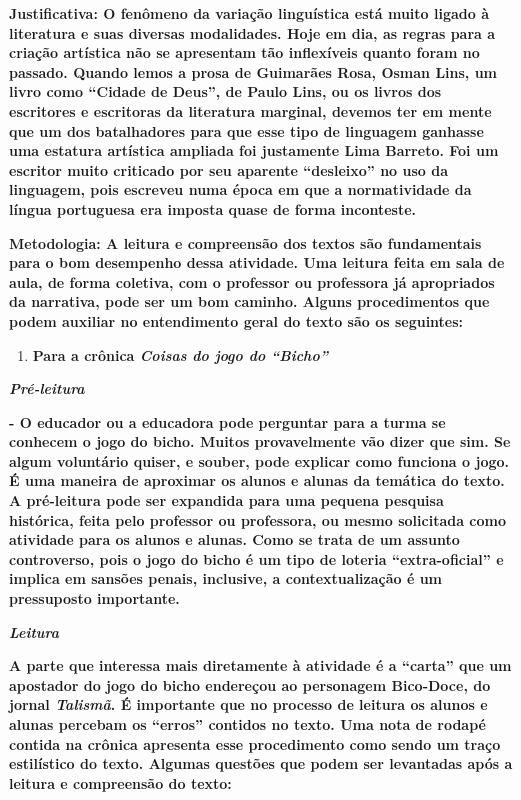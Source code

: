 \textbf{Justificativa: O fenômeno da variação linguística está muito
ligado à literatura e suas diversas modalidades. Hoje em dia, as regras
para a criação artística não se apresentam tão inflexíveis quanto foram
no passado. Quando lemos a prosa de Guimarães Rosa, Osman Lins, um livro
como ``Cidade de Deus'', de Paulo Lins, ou os livros dos escritores e
escritoras da literatura marginal, devemos ter em mente que um dos
batalhadores para que esse tipo de linguagem ganhasse uma estatura
artística ampliada foi justamente Lima Barreto. Foi um escritor muito
criticado por seu aparente ``desleixo'' no uso da linguagem, pois
escreveu numa época em que a normatividade da língua portuguesa era
imposta quase de forma inconteste. }

\textbf{Metodologia: A leitura e compreensão dos textos são fundamentais
para o bom desempenho dessa atividade. Uma leitura feita em sala de
aula, de forma coletiva, com o professor ou professora já apropriados da
narrativa, pode ser um bom caminho. Alguns procedimentos que podem
auxiliar no entendimento geral do texto são os seguintes:}

\begin{enumerate}
\def\labelenumi{\arabic{enumi})}
\item
  \textbf{Para a crônica \emph{Coisas do jogo do ``Bicho''}}
\end{enumerate}

\emph{\textbf{Pré-leitura}}

\textbf{- O educador ou a educadora pode perguntar para a turma se
conhecem o jogo do bicho. Muitos provavelmente vão dizer que sim. Se
algum voluntário quiser, e souber, pode explicar como funciona o jogo. É
uma maneira de aproximar os alunos e alunas da temática do texto. A
pré-leitura pode ser expandida para uma pequena pesquisa histórica,
feita pelo professor ou professora, ou mesmo solicitada como atividade
para os alunos e alunas. Como se trata de um assunto controverso, pois o
jogo do bicho é um tipo de loteria ``extra-oficial'' e implica em
sansões penais, inclusive, a contextualização é um pressuposto
importante.}

\emph{\textbf{Leitura}}

\textbf{A parte que interessa mais diretamente à atividade é a ``carta''
que um apostador do jogo do bicho endereçou ao personagem Bico-Doce, do
jornal \emph{Talismã}. É importante que no processo de leitura os alunos
e alunas percebam os ``erros'' contidos no texto. Uma nota de rodapé
contida na crônica apresenta esse procedimento como sendo um traço
estilístico do texto. Algumas questões que podem ser levantadas após a
leitura e compreensão do texto:}

